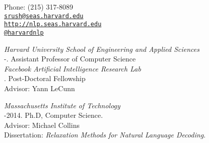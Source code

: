 \documentclass[11pt]{article}
\makeatletter
\def\myemail{srush@seas.harvard.edu}
\def\myweb{http://nlp.seas.harvard.edu}
\def\myphone{(215) 317-8089}
\def\myfax{harvardnlp}
\makeatother
\begin{document}
\begin{minipage}[t]{2.95in}
  
\end{minipage}
\hfill     
\hfill
\begin{minipage}[t]{1.7in}
  \flushright \footnotesize Phone: \myphone \\ 
  {\scriptsize  \texttt{\href{mailto:\myemail}{\myemail}}} \\
  {\scriptsize  \texttt{\href{\myweb}{\myweb}}} \\
  {\scriptsize  \texttt{\href{http://twitter.com/\myfax}{@\myfax}}} \\
\end{minipage}


\medskip

\reversemarginpar

\medskip       

\noindent\emph{Harvard University School of Engineering and Applied Sciences \vspace{0.01in}}\\
-.  Assistant Professor of Computer Science\\



\noindent\emph{Facebook Artificial Intelligence Research Lab \vspace{0.01in}}\\
.  Post-Doctoral Fellowship\\
\ind Advisor: Yann LeCunn

\medskip
 
\noindent\emph{Massachusetts Institute of Technology \vspace{0.01in}}\\
-2014.  Ph.D, Computer Science.\\
\ind Advisor: Michael Collins\\
\ind Dissertation: \emph{Relaxation Methods for Natural Language Decoding}. %
\end{document}
